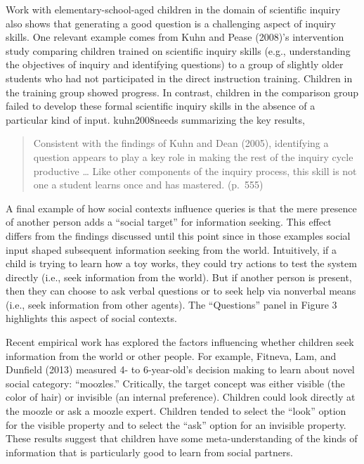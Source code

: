 \documentclass[english,floatsintext,man]{apa6}
\theoremstyle{definition}
\theoremstyle{definition}
\theoremstyle{definition}
\theoremstyle{remark}
\begin{document}
Work with elementary-school-aged children in the domain of scientific
inquiry also shows that generating a good question is a challenging
aspect of inquiry skills. One relevant example comes from Kuhn and Pease
(2008)'s intervention study comparing children trained on scientific
inquiry skills (e.g., understanding the objectives of inquiry and
identifying questions) to a group of slightly older students who had not
participated in the direct instruction training. Children in the
training group showed progress. In contrast, children in the comparison
group failed to develop these formal scientific inquiry skills in the
absence of a particular kind of input. kuhn2008needs summarizing the key
results,

\begin{quote}
Consistent with the findings of Kuhn and Dean (2005), identifying a
question appears to play a key role in making the rest of the inquiry
cycle productive \ldots{} Like other components of the inquiry process,
this skill is not one a student learns once and has mastered. (p.~555)
\end{quote}

A final example of how social contexts influence queries is that the
mere presence of another person adds a \enquote{social target} for
information seeking. This effect differs from the findings discussed
until this point since in those examples social input shaped subsequent
information seeking from the world. Intuitively, if a child is trying to
learn how a toy works, they could try actions to test the system
directly (i.e., seek information from the world). But if another person
is present, then they can choose to ask verbal questions or to seek help
via nonverbal means (i.e., seek information from other agents). The
\enquote{Questions} panel in Figure 3 highlights this aspect of social
contexts.

Recent empirical work has explored the factors influencing whether
children seek information from the world or other people. For example,
Fitneva, Lam, and Dunfield (2013) measured 4- to 6-year-old's decision
making to learn about novel social category: \enquote{moozles.}
Critically, the target concept was either visible (the color of hair) or
invisible (an internal preference). Children could look directly at the
moozle or ask a moozle expert. Children tended to select the
\enquote{look} option for the visible property and to select the
\enquote{ask} option for an invisible property. These results suggest
that children have some meta-understanding of the kinds of information
that is particularly good to learn from social partners.
\end{document}
